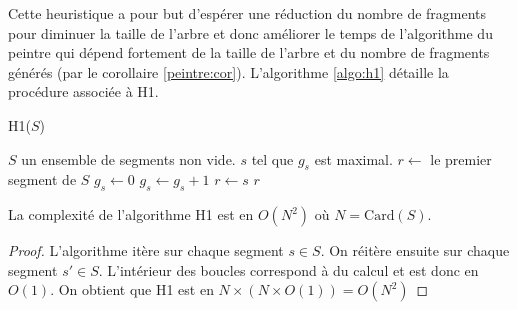 Cette heuristique a pour but d'espérer une réduction du nombre de fragments
pour diminuer la taille de l'arbre
et donc améliorer le temps de l'algorithme du peintre qui dépend
fortement de la taille de l'arbre et du nombre de fragments générés (par
le corollaire \ref{peintre:cor}). L'algorithme \ref{algo:h1} détaille
la procédure associée à H1.

\begin{algorithm}
  \caption{H1($S$)}
  \begin{algorithmic}[1] \label{algo:h1}
    \REQUIRE $S$ un ensemble de segments non vide.
    \ENSURE $s$ tel que $g_s$ est maximal.
    \STATE$r\leftarrow$ le premier segment de $S$
    \STATE $g_s\leftarrow 0$
    \ENDFOR
    \STATE $g_s\leftarrow g_s +1$
    \ENDIF
    \ENDFOR
    \STATE $r\leftarrow s$
    \ENDIF
    \ENDFOR
    \RETURN $r$
  \end{algorithmic}
\end{algorithm}

\begin{prop}
  La complexité de l'algorithme H1 est en $O(N^2)$ où $N = \mathrm{Card}(S)$.
\end{prop}
\begin{proof}
  L'algorithme itère sur chaque segment $s \in S$.
  On réitère ensuite sur chaque segment $s' \in S$.
  L'intérieur des boucles correspond à du calcul et
  est donc en $O(1)$. On obtient que H1 est en $N\times(N\times{}O(1)) = O(N^2)$
\end{proof}



